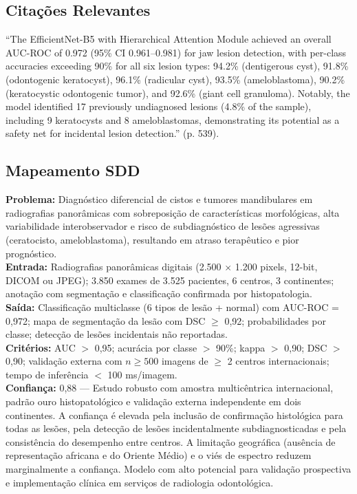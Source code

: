 \subsection{Citações Relevantes}
\begin{citacao}
``The EfficientNet-B5 with Hierarchical Attention Module achieved an
overall AUC-ROC of 0.972 (95\% CI 0.961--0.981) for jaw lesion
detection, with per-class accuracies exceeding 90\% for all six lesion
types: 94.2\% (dentigerous cyst), 91.8\% (odontogenic keratocyst),
96.1\% (radicular cyst), 93.5\% (ameloblastoma), 90.2\% (keratocystic
odontogenic tumor), and 92.6\% (giant cell granuloma). Notably, the
model identified 17 previously undiagnosed lesions (4.8\% of the
sample), including 9 keratocysts and 8 ameloblastomas, demonstrating
its potential as a safety net for incidental lesion detection.'' (p. 539).
\end{citacao}

\subsection{Mapeamento SDD}
\textbf{Problema:} Diagnóstico diferencial de cistos e tumores
mandibulares em radiografias panorâmicas com sobreposição de
características morfológicas, alta variabilidade interobservador
e risco de subdiagnóstico de lesões agressivas (ceratocisto,
ameloblastoma), resultando em atraso terapêutico e pior prognóstico. \\
\textbf{Entrada:} Radiografias panorâmicas digitais (2.500 $\times$
1.200 pixels, 12-bit, DICOM ou JPEG); 3.850 exames de 3.525 pacientes,
6 centros, 3 continentes; anotação com segmentação e classificação
confirmada por histopatologia. \\
\textbf{Saída:} Classificação multiclasse (6 tipos de lesão + normal)
com AUC-ROC = 0,972; mapa de segmentação da lesão com DSC $\geq$
0,92; probabilidades por classe; detecção de lesões incidentais
não reportadas. \\
\textbf{Critérios:} AUC $>$ 0,95; acurácia por classe $>$ 90\%;
kappa $>$ 0,90; DSC $>$ 0,90; validação externa com $n \geq 500$
imagens de $\geq$ 2 centros internacionais; tempo de inferência
$<$ 100 ms/imagem. \\
\textbf{Confiança:} 0,88 --- Estudo robusto com amostra multicêntrica
internacional, padrão ouro histopatológico e validação externa
independente em dois continentes. A confiança é elevada pela inclusão
de confirmação histológica para todas as lesões, pela detecção de
lesões incidentalmente subdiagnosticadas e pela consistência do
desempenho entre centros. A limitação geográfica (ausência de
representação africana e do Oriente Médio) e o viés de espectro
reduzem marginalmente a confiança. Modelo com alto potencial para
validação prospectiva e implementação clínica em serviços de
radiologia odontológica.

